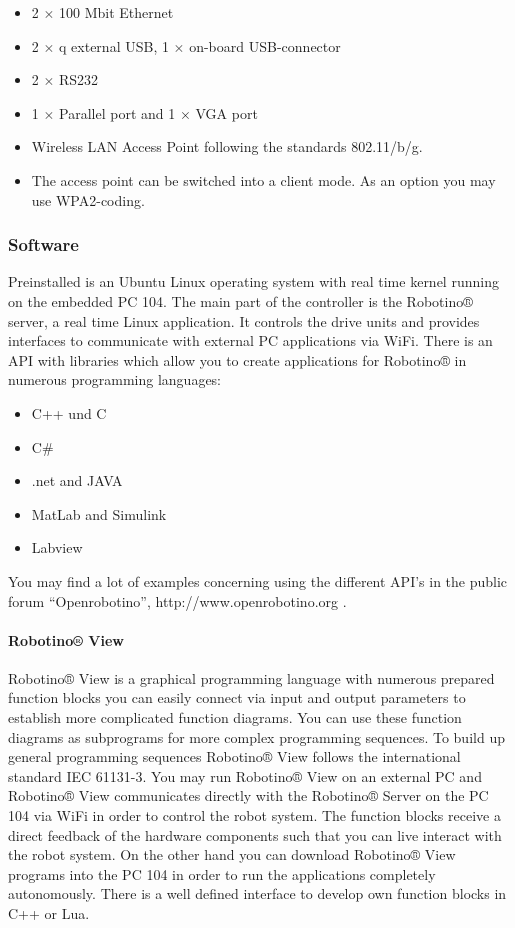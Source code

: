 \documentclass[12pt,twoside]{article}
\begin{document}
\begin{appendix}
\begin{itemize}
\item 2 $\times$ 100 Mbit Ethernet
\item 2 $\times$ q external USB, 1 $\times$ on-board USB-connector
\item 2 $\times$  RS232
\item 1 $\times$ Parallel port and 1 $\times$ VGA port
\item Wireless LAN Access Point following the standards 802.11/b/g.
\item The access point can be switched into a client mode.  As an
  option you may use WPA2-coding.
\end{itemize}

\subsubsection{Software}
Preinstalled is an Ubuntu Linux operating system with real time kernel
running on the embedded PC 104. The main part of the controller is the
Robotino® server, a real time Linux application. It controls the drive
units and provides interfaces to communicate with external PC
applications via WiFi. There is an API with libraries which allow you
to create applications for Robotino® in numerous programming languages:

\begin{itemize}
	\item C++ und C 
	\item C\# 
	\item .net and JAVA 
	\item MatLab and Simulink
	\item Labview
\end{itemize}

You may find a lot of examples concerning using the different API’s in
the public forum “Openrobotino”, http://www.openrobotino.org .

\paragraph{Robotino® View} 

Robotino® View is a graphical programming language with numerous
prepared function blocks you can easily connect via input and output
parameters to establish more complicated function diagrams. You can use
these function diagrams as subprograms for more complex programming
sequences. To build up general programming sequences Robotino® View
follows the international standard IEC 61131-3. You may run Robotino®
View on an external PC and Robotino® View communicates directly with
the Robotino® Server on the PC 104 via WiFi in order to control the
robot system. The function blocks receive a direct feedback of the
hardware components such that you can live interact with the robot
system. On the other hand you can download Robotino® View programs into
the PC 104 in order to run the applications completely autonomously.
There is a well defined interface to develop own function blocks in C++
or Lua.


\end{appendix}
\end{document}

